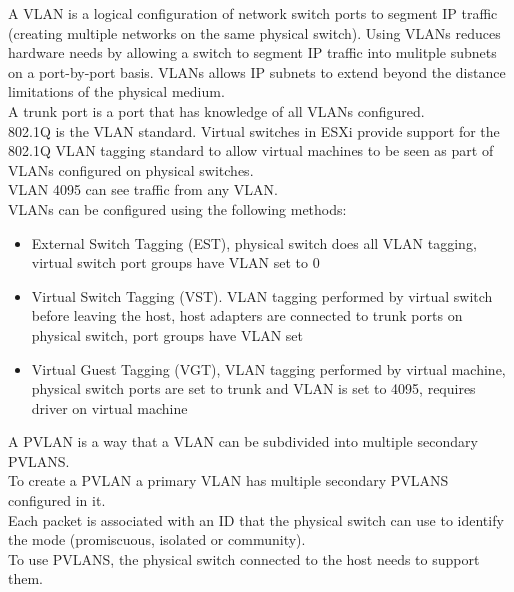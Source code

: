 A VLAN is a logical configuration of network switch ports to segment IP
traffic (creating multiple networks on the same physical switch). Using VLANs
reduces hardware needs by allowing a switch to segment IP traffic into
mulitple subnets on a port-by-port basis. VLANs allows IP subnets to extend
beyond the distance limitations of the physical medium.\\

A trunk port is a port that has knowledge of all VLANs configured.\\

802.1Q is the VLAN standard. Virtual switches in ESXi provide support for the
802.1Q VLAN tagging standard to allow virtual machines to be seen as part of
VLANs configured on physical switches.\\

VLAN 4095 can see traffic from any VLAN.\\

VLANs can be configured using the following methods:

\begin{itemize}

\item External Switch Tagging (EST), physical switch does all VLAN tagging,
virtual switch port groups have VLAN set to 0

\item Virtual Switch Tagging (VST). VLAN tagging performed by virtual switch
before leaving the host, host adapters are connected to trunk ports on
physical switch, port groups have VLAN set

\item Virtual Guest Tagging (VGT), VLAN tagging performed by virtual machine,
physical switch ports are set to trunk and VLAN is set to 4095, requires
driver on virtual machine

\end{itemize}

A PVLAN is a way that a VLAN can be subdivided into multiple secondary PVLANS.\\

To create a PVLAN a primary VLAN has multiple secondary PVLANS configured in
it.\\

Each packet is associated with an ID that the physical switch can use to
identify the mode (promiscuous, isolated or community).\\

To use PVLANS, the physical switch connected to the host needs to support them.\\

